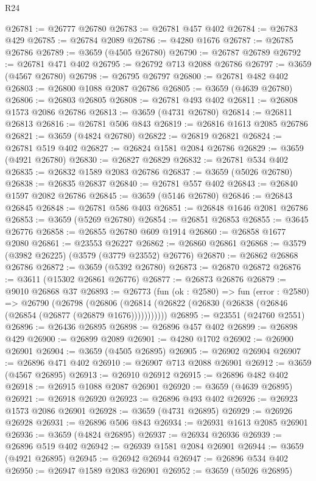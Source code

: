 \begin{lexlean}{R24}
\begin{coremodule}
@26781 := @26777 @26780
@26783 := @26781 @457 @402
@26784 := @26783 @429
@26785 := @26784 @2089
@26786 := @4280 @1676
@26787 := @26785 @26786
@26789 := @3659 (@4505 @26780)
@26790 := @26787 @26789
@26792 := @26781 @471 @402
@26795 := @26792 @713 @2088 @26786
@26797 := @3659 (@4567 @26780)
@26798 := @26795 @26797
@26800 := @26781 @482 @402
@26803 := @26800 @1088 @2087 @26786
@26805 := @3659 (@4639 @26780)
@26806 := @26803 @26805
@26808 := @26781 @493 @402
@26811 := @26808 @1573 @2086 @26786
@26813 := @3659 (@4731 @26780)
@26814 := @26811 @26813
@26816 := @26781 @506 @843
@26819 := @26816 @1613 @2085 @26786
@26821 := @3659 (@4824 @26780)
@26822 := @26819 @26821
@26824 := @26781 @519 @402
@26827 := @26824 @1581 @2084 @26786
@26829 := @3659 (@4921 @26780)
@26830 := @26827 @26829
@26832 := @26781 @534 @402
@26835 := @26832 @1589 @2083 @26786
@26837 := @3659 (@5026 @26780)
@26838 := @26835 @26837
@26840 := @26781 @557 @402
@26843 := @26840 @1597 @2082 @26786
@26845 := @3659 (@5146 @26780)
@26846 := @26843 @26845
@26848 := @26781 @586 @403
@26851 := @26848 @1646 @2081 @26786
@26853 := @3659 (@5269 @26780)
@26854 := @26851 @26853
@26855 := @3645 @26776
@26858 := @26855 @26780 @609 @1914
@26860 := @26858 @1677 @2080
@26861 := @23553 @26227
@26862 := @26860 @26861
@26868 := @3579 (@3982 @26225) (@3579 (@3779 @23552) @26776)
@26870 := @26862 @26868 @26786
@26872 := @3659 (@5392 @26780)
@26873 := @26870 @26872
@26876 := @3611 (@15302 @26861 @26776)
@26877 := @26873 @26876
@26879 := @9010 @26868 @37
@26893 := @26773
    (fun (ok : @2580) =>
    fun (error : @2580) =>
    @26790
      (@26798
        (@26806 (@26814 (@26822 (@26830 (@26838 (@26846 (@26854 (@26877 (@26879 @1676)))))))))))
@26895 := @23551 (@24760 @2551)
@26896 := @26436 @26895
@26898 := @26896 @457 @402
@26899 := @26898 @429
@26900 := @26899 @2089
@26901 := @4280 @1702
@26902 := @26900 @26901
@26904 := @3659 (@4505 @26895)
@26905 := @26902 @26904
@26907 := @26896 @471 @402
@26910 := @26907 @713 @2088 @26901
@26912 := @3659 (@4567 @26895)
@26913 := @26910 @26912
@26915 := @26896 @482 @402
@26918 := @26915 @1088 @2087 @26901
@26920 := @3659 (@4639 @26895)
@26921 := @26918 @26920
@26923 := @26896 @493 @402
@26926 := @26923 @1573 @2086 @26901
@26928 := @3659 (@4731 @26895)
@26929 := @26926 @26928
@26931 := @26896 @506 @843
@26934 := @26931 @1613 @2085 @26901
@26936 := @3659 (@4824 @26895)
@26937 := @26934 @26936
@26939 := @26896 @519 @402
@26942 := @26939 @1581 @2084 @26901
@26944 := @3659 (@4921 @26895)
@26945 := @26942 @26944
@26947 := @26896 @534 @402
@26950 := @26947 @1589 @2083 @26901
@26952 := @3659 (@5026 @26895)

\end{coremodule}
\end{lexlean}
